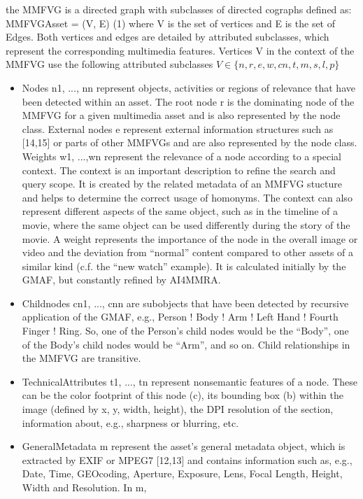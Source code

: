 the MMFVG is a directed graph with subclasses of directed cographs defined as:
MMFVGAsset = (V, E) (1)
where V is the set of vertices and E is the set of Edges. Both vertices and edges are
detailed by attributed subclasses, which represent the corresponding multimedia features.
Vertices V in the context of the MMFVG use the following attributed subclasses $V \in
\{n, r, e,w, cn, t,m, s, l, p\}$
\begin{itemize}
    \item Nodes n1, ..., nn represent objects, activities or regions of relevance that have been
detected within an asset. The root node r is the dominating node of the MMFVG for a
given multimedia asset and is also represented by the node class. External nodes e
represent external information structures such as [14,15] or parts of other MMFVGs
and are also represented by the node class.
Weights w1, ...,wn represent the relevance of a node according to a special context.
The context is an important description to refine the search and query scope. It is
created by the related metadata of an MMFVG stucture and helps to determine the
correct usage of homonyms. The context can also represent different aspects of the
same object, such as in the timeline of a movie, where the same object can be used
differently during the story of the movie. A weight represents the importance of the
node in the overall image or video and the deviation from “normal” content compared
to other assets of a similar kind (c.f. the “new watch” example). It is calculated initially
by the GMAF, but constantly refined by AI4MMRA.
\item Childnodes cn1, ..., cnn are subobjects that have been detected by recursive application
of the GMAF, e.g., Person ! Body ! Arm ! Left Hand ! Fourth Finger !
Ring. So, one of the Person’s child nodes would be the “Body”, one of the Body’s child
nodes would be “Arm”, and so on. Child relationships in the MMFVG are transitive.
\item TechnicalAttributes t1, ..., tn represent nonsemantic features of a node. These can be
the color footprint of this node (c), its bounding box (b) within the image (defined by x,
y, width, height), the DPI resolution of the section, information about, e.g., sharpness
or blurring, etc.
\item GeneralMetadata m represent the asset’s general metadata object, which is extracted
by EXIF or MPEG7 [12,13] and contains information such as, e.g., Date, Time, GEOcoding,
Aperture, Exposure, Lens, Focal Length, Height, Width and Resolution. In m,

\end{itemize}
